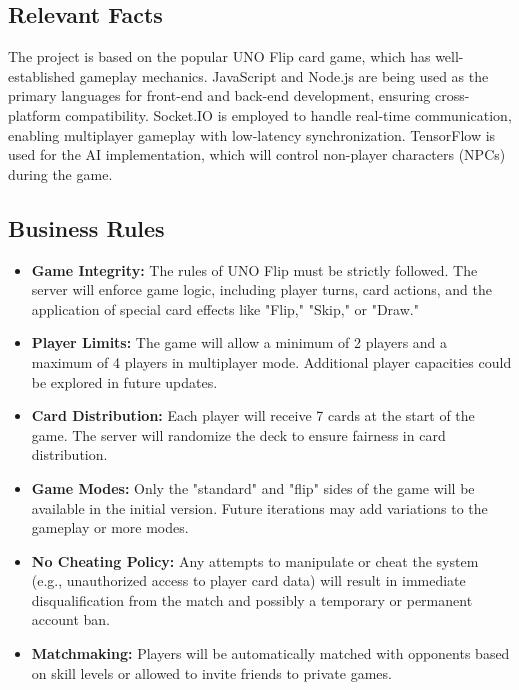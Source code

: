 \documentclass{article}
\begin{document}
\subsection{Relevant Facts}
The project is based on the popular UNO Flip card game, which has well-established gameplay mechanics. JavaScript and Node.js are being used as the primary languages for front-end and back-end development, ensuring cross-platform compatibility. Socket.IO is employed to handle real-time communication, enabling multiplayer gameplay with low-latency synchronization. TensorFlow is used for the AI implementation, which will control non-player characters (NPCs) during the game.

\subsection{Business Rules}
\begin{itemize}
    \item \textbf{Game Integrity:} The rules of UNO Flip must be strictly followed. The server will enforce game logic, including player turns, card actions, and the application of special card effects like "Flip," "Skip," or "Draw."
    \item \textbf{Player Limits:} The game will allow a minimum of 2 players and a maximum of 4 players in multiplayer mode. Additional player capacities could be explored in future updates.
    \item \textbf{Card Distribution:} Each player will receive 7 cards at the start of the game. The server will randomize the deck to ensure fairness in card distribution.
    \item \textbf{Game Modes:} Only the "standard" and "flip" sides of the game will be available in the initial version. Future iterations may add variations to the gameplay or more modes.
    \item \textbf{No Cheating Policy:} Any attempts to manipulate or cheat the system (e.g., unauthorized access to player card data) will result in immediate disqualification from the match and possibly a temporary or permanent account ban.
    \item \textbf{Matchmaking:} Players will be automatically matched with opponents based on skill levels or allowed to invite friends to private games.
\end{itemize}
\end{document}
